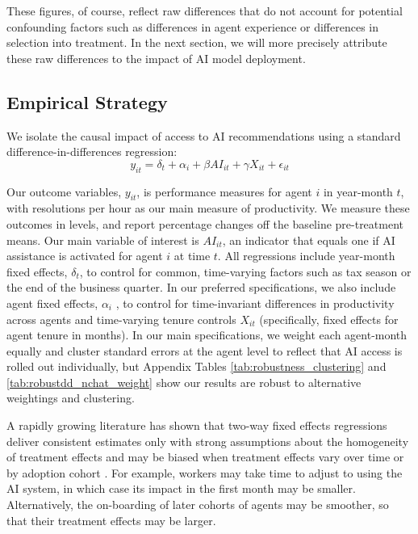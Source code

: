\documentclass[11pt]{article}
\begin{document}
These figures, of course, reflect raw differences that do not account for potential confounding factors such as differences in agent experience or differences in selection into treatment.  In the next section, we will more precisely attribute these raw differences to the impact of AI model deployment.

\subsection{Empirical Strategy}

We isolate the causal impact of access to AI recommendations using a standard difference-in-differences regression:
\begin{equation} \label{eq:dd_main}
y_{it}= \delta_{t} + \alpha_{i} + \beta AI_{it} + \gamma X_{it}+ \epsilon_{it}
\end{equation}

Our outcome variables, $y_{it}$, is performance measures for agent $i$ in year-month $t$, with resolutions per hour as our main measure of productivity.  We measure these outcomes in levels, and report percentage changes off the baseline pre-treatment means.  Our main variable of interest is $AI_{it}$, an indicator that equals one if AI assistance is activated for agent $i$ at time $t$.  All regressions include year-month fixed effects, $\delta_{t}$, to control for common, time-varying factors such as tax season or the end of the business quarter.  In our preferred specifications, we also include agent fixed effects, $\alpha_{i}$ , to control for time-invariant differences in productivity across agents and time-varying tenure controls $X_{it}$ (specifically, fixed effects for agent tenure in months).  In our main specifications, we weight each agent-month equally and cluster standard errors at the agent level to reflect that AI access is rolled out individually, but Appendix Tables \ref{tab:robustness_clustering} and \ref{tab:robustdd_nchat_weight} show our results are robust to alternative weightings and clustering. 

A rapidly growing literature has shown that two-way fixed effects regressions deliver consistent estimates only with strong assumptions about the homogeneity of treatment effects and may be biased when treatment effects vary over time or by adoption cohort \citep{cengiz_effect_2019,dechaisemartin2020,sun_estimating_2020,goodman-bacon_2021,callaway_2021, borusyak2022revisiting}. For example, workers may take time to adjust to using the AI system, in which case its impact in the first month may be smaller.  Alternatively, the on-boarding of later cohorts of agents may be smoother, so that their treatment effects may be larger.
\end{document}
